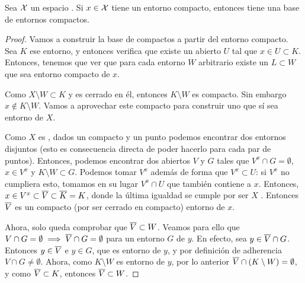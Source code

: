 


\begin{prop}
	Sea $\mathcal{X}$ un espacio \hausdorff. Si $x\in \mathcal{X}$ tiene un entorno compacto, entonces tiene una base de entornos compactos.
	
	\begin{proof}
		Vamos a construir la base de compactos a partir del entorno compacto. Sea $K$ ese entorno, y entonces verifica que existe un abierto $U$ tal que $x\in U\subset K$. Entonces, tenemos que ver que para cada entorno $W$ arbitrario existe un $L\subset W$ que sea entorno compacto de $x$.
		
		Como $X\setminus W\subset K$ y es cerrado en él, entonces $K\setminus W$ es compacto. Sin embargo $x\notin K\setminus W$. Vamos a aprovechar este compacto para construir uno que sí sea entorno de $X$.
		
		Como $X$ es \hausdorff, dados un compacto y un punto podemos encontrar dos entornos disjuntos (esto es consecuencia directa de poder hacerlo para cada par de puntos). Entonces, podemos encontrar dos abiertos $V$ y $G$ tales que $V^x\cap G=\emptyset$, $x\in V^x$ y $K\setminus W\subset G$. Podemos tomar $V^x$ además de forma que $V^x\subset U$: si $V^x$ no cumpliera esto, tomamos en su lugar $V^x\cap U$ que también contiene a $x$. Entonces, $x\in V^x\subset \overline{V}\subset \overline{K}=K$, donde la última igualdad se cumple por ser $X$ \hausdorff. Entonces $\overline{V}$ es un compacto (por ser cerrado en compacto) entorno de $x$.
		
		Ahora, solo queda comprobar que $\overline{V}\subset W$. Veamos para ello que $V\cap G=\emptyset\implies \overline{V}\cap G=\emptyset$ para un entorno $G$ de $y$. En efecto, sea $y\in \overline{V}\cap G$. Entonces $y\in\overline{V}$ e $y\in G$, que es entorno de $y$, y por definición de adherencia $V\cap G\neq\emptyset$. Ahora, como $K\setminus W$ es entorno de $y$, por lo anterior $\overline{V}\cap (K\setminus W)=\emptyset$, y como $\overline{V}\subset K$, entonces $\overline{V}\subset W$.
	\end{proof}
\end{prop}